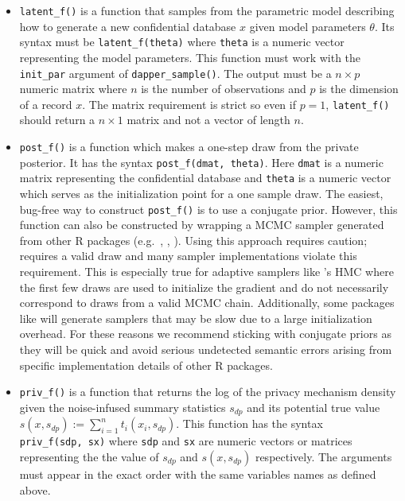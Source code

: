 \begin{itemize}
\item
  \texttt{latent\_f()} is a function that samples from the parametric model
  describing how to generate a new confidential database \(x\) given model parameters \(\theta\).
  Its syntax must be \texttt{latent\_f(theta)} where \texttt{theta} is a numeric vector
  representing the model parameters. This function
  must work with the \texttt{init\_par} argument of \texttt{dapper\_sample()}. The output must be a \(n \times p\) numeric matrix
  where \(n\) is the number of observations and \(p\) is the dimension of a record \(x\).
  The matrix requirement is strict so even if \(p = 1\),
  \texttt{latent\_f()} should return a \(n \times 1\) matrix and not a vector of length \(n\).
\item
  \texttt{post\_f()} is a function which makes a one-step draw from the private posterior. It has
  the syntax \texttt{post\_f(dmat,\ theta)}. Here \texttt{dmat} is a numeric matrix representing the confidential database
  and \texttt{theta} is a numeric vector which serves as the initialization point for a one sample draw.
  The easiest, bug-free way to construct \texttt{post\_f()} is to use a conjugate prior. However,
  this function can also be constructed by wrapping a MCMC sampler generated from other R packages
  (e.g.~, , ). Using this approach requires caution;
   requires a valid draw and many sampler implementations violate
  this requirement. This is especially true for adaptive samplers like 's HMC where
  the first few draws are used to initialize the gradient and do not necessarily correspond to draws from a valid MCMC chain.
  Additionally, some packages like  will generate samplers that may be slow
  due to a large initialization overhead. For these
  reasons we recommend sticking with conjugate priors as they will be quick and avoid
  serious undetected semantic errors arising from specific implementation details of other R packages.
\item
  \texttt{priv\_f()} is a function that returns the log of the privacy mechanism density given
  the noise-infused summary statistics \(s_{dp}\) and its potential true value \(s(x, s_{dp}) := \sum_{i=1}^{n} t_i(x_i, s_{dp})\).
  This function has the syntax \texttt{priv\_f(sdp,\ sx)} where \texttt{sdp} and \texttt{sx}
  are numeric vectors or matrices representing the
  the value of \(s_{dp}\) and \(s(x, s_{dp})\) respectively.
  The arguments must appear in the exact order with the same variables names as defined above.

\end{itemize}
